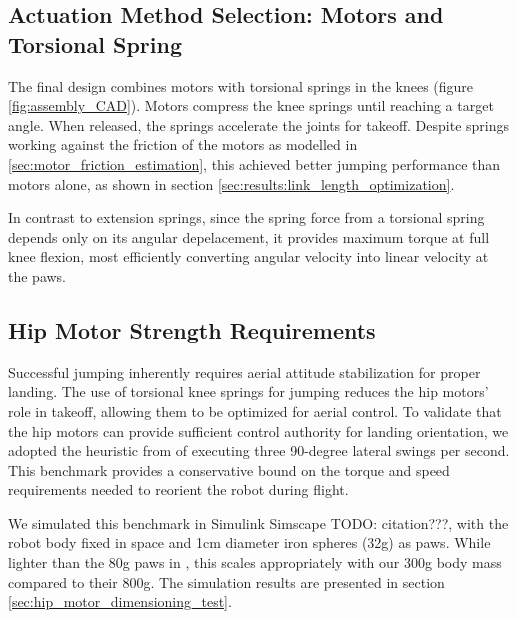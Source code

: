 \subsection{Actuation Method Selection: Motors and Torsional Spring}

The final design combines motors with torsional springs in the knees (figure \ref{fig:assembly_CAD}). Motors compress the knee springs until reaching a target angle. When released, the springs accelerate the joints for takeoff. Despite springs working against the friction of the motors as modelled in \ref{sec:motor_friction_estimation}, this achieved better jumping performance than motors alone, as shown in section \ref{sec:results:link_length_optimization}. 

In contrast to extension springs, since the spring force from a torsional spring depends only on its angular depelacement, it provides maximum torque at full knee flexion, most efficiently converting angular velocity into linear velocity at the paws.


\subsection{Hip Motor Strength Requirements}
\label{sec:hip_motor_dimensioning_test_design}

Successful jumping inherently requires aerial attitude stabilization for proper landing. The use of torsional knee springs for jumping reduces the hip motors' role in takeoff, allowing them to be optimized for aerial control. To validate that the hip motors can provide sufficient control authority for landing orientation, we adopted the heuristic from \cite{finn_tarek_master} of executing three 90-degree lateral swings per second. This benchmark provides a conservative bound on the torque and speed requirements needed to reorient the robot during flight.

We simulated this benchmark in Simulink Simscape TODO: citation???, with the robot body fixed in space and 1cm diameter iron spheres (32g) as paws. While lighter than the 80g paws in \cite{finn_tarek_master}, this scales appropriately with our 300g body mass compared to their 800g. The simulation results are presented in section \ref{sec:hip_motor_dimensioning_test}.